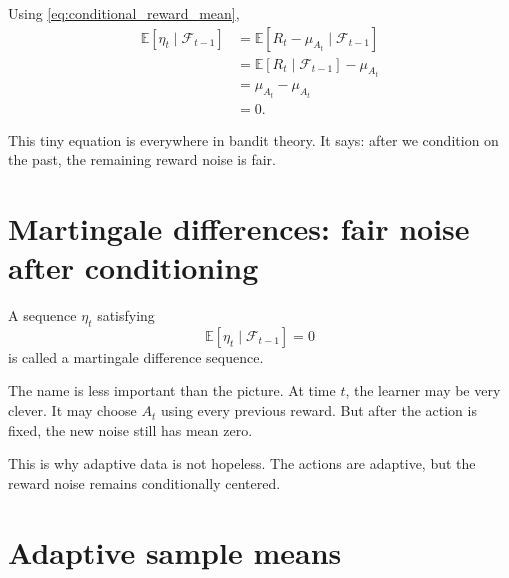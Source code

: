 \documentclass[en,nofont,11pt]{elegantbook}
\newcommand{\E}{\mathbb{E}}
\newcommand{\F}{\mathcal{F}}
\begin{document}
Using \eqref{eq:conditional_reward_mean},
\begin{align}
\E[\eta_t\mid \F_{t-1}]
&= \E[R_t-\mu_{A_t}\mid \F_{t-1}] \\
&= \E[R_t\mid \F_{t-1}] - \mu_{A_t} \\
&= \mu_{A_t} - \mu_{A_t} \\
&= 0. \label{eq:martingale_difference}
\end{align}

This tiny equation is everywhere in bandit theory.  It says: after we condition on the past, the remaining reward noise is fair.

\chapter{Martingale differences: fair noise after conditioning}

A sequence $\eta_t$ satisfying
\begin{equation}
\E[\eta_t\mid \F_{t-1}]=0
\end{equation}
is called a martingale difference sequence.

The name is less important than the picture.  At time $t$, the learner may be very clever.  It may choose $A_t$ using every previous reward.  But after the action is fixed, the new noise still has mean zero.

\begin{center}
\end{center}

This is why adaptive data is not hopeless.  The actions are adaptive, but the reward noise remains conditionally centered.

\chapter{Adaptive sample means}
\end{document}
